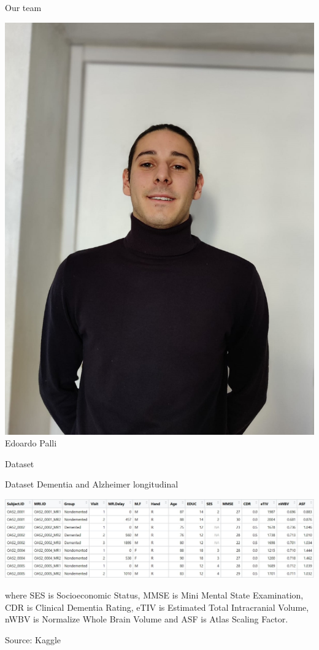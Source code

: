\documentclass{beamer}
\begin{document}
\begin{frame}{Our team}
\begin{minipage}{0.24\textwidth}
\begin{center}
		\includegraphics[width=\columnwidth]{edoardotaglio.jpeg}
		Edoardo Palli
	\end{center}
\end{minipage}


\end{frame}

	
	
	\begin{frame}{Dataset}
		
		Dataset Dementia and Alzheimer longitudinal
		\begin{center}
			
			
			\includegraphics[width=\columnwidth]{dataset_al.jpeg}
		\end{center}
		
		
		where SES is Socioeconomic Status, MMSE is Mini Mental State Examination, CDR is Clinical Dementia Rating, eTIV is Estimated Total Intracranial Volume, nWBV is Normalize Whole Brain Volume and ASF is Atlas Scaling Factor.
		
		\vspace{0.1 cm}
		Source: Kaggle
		
		
	\end{frame}
	
\end{document}
